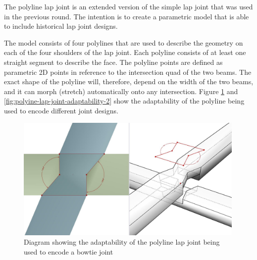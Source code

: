 The polyline lap joint is an extended version of the simple lap joint that was used in the previous round. The intention is to create a parametric model that is able to include historical lap joint designs.

The model consists of four polylines that are used to describe the geometry on each of the four shoulders of the lap joint. Each polyline consists of at least one straight segment to describe the face. The polyline points are defined as parametric 2D points in reference to the intersection quad of the two beams. The exact shape of the polyline will, therefore, depend on the width of the two beams, and it can morph (stretch) automatically onto any intersection. Figure \ref{fig:polyine-lap-joint-adaptability} and \ref{fig:polyine-lap-joint-adaptability-2} show the adaptability of the polyline being used to encode different joint designs.

\begin{figure}[!h]
    \centering
    \includegraphics[width=0.99\textwidth]{images/7a/img08.jpg}
    \caption{Diagram showing the adaptability of the polyline lap joint being used to encode a bowtie joint}
    \label{fig:polyine-lap-joint-adaptability}
\end{figure}


